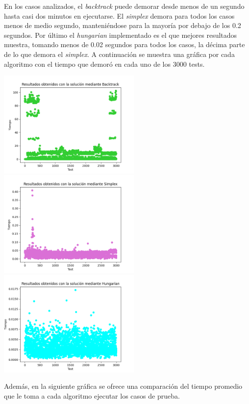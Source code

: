 \documentclass[10pt]{article} %
\begin{document}
	En los casos analizados, el \textit{backtrack} puede demorar desde menos de un segundo hasta casi dos minutos en ejecutarse. El \textit{simplex} demora para todos los casos menos de medio segundo, manteni\'endose para la mayor\'ia por debajo de los 0.2 segundos. Por \'ultimo el \textit{hungarian} implementado es el que mejores resultados muestra, tomando menos de 0.02 segundos para todos los casos, la d\'ecima parte de lo que demora el \textit{simplex}. A continuaci\'on se muestra una gr\'afica por cada algoritmo con el tiempo que demor\'o en cada uno de los 3000 tests. 
	\begin{center}
		\includegraphics[width=7cm]{Backtrack_results.png}\\
		\includegraphics[width=7cm]{Simplex_results.png}
		\includegraphics[width=7cm]{Hungarian_results.png}
	\end{center}  
	
	Adem\'as, en la siguiente gr\'afica se ofrece una comparaci\'on del tiempo promedio que le toma a cada algoritmo ejecutar los casos de prueba. 
	
\end{document}

